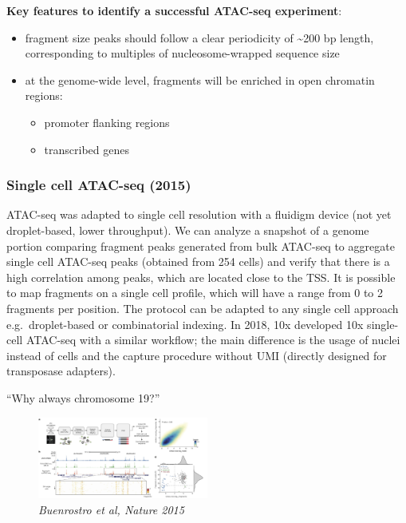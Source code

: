 \textbf{Key features to identify a successful ATAC-seq experiment}:

\begin{itemize}
\tightlist
\item
  fragment size peaks should follow a clear periodicity of
  \textasciitilde200 bp length, corresponding to multiples of
  nucleosome-wrapped sequence size
\item
  at the genome-wide level, fragments will be enriched in open chromatin
  regions:

  \begin{itemize}
  \tightlist
  \item
    promoter flanking regions
  \item
    transcribed genes
  \end{itemize}
\end{itemize}

\hypertarget{single-cell-atac-seq-2015}{%
\subsubsection{Single cell ATAC-seq
(2015)}\label{single-cell-atac-seq-2015}}

ATAC-seq was adapted to single cell resolution with a fluidigm device
(not yet droplet-based, lower throughput). We can analyze a snapshot of
a genome portion comparing fragment peaks generated from bulk ATAC-seq
to aggregate single cell ATAC-seq peaks (obtained from 254 cells) and
verify that there is a high correlation among peaks, which are located
close to the TSS. It is possible to map fragments on a single cell
profile, which will have a range from 0 to 2 fragments per position. The
protocol can be adapted to any single cell approach e.g.~droplet-based
or combinatorial indexing. In 2018, 10x developed 10x single-cell
ATAC-seq with a similar workflow; the main difference is the usage of
nuclei instead of cells and the capture procedure without UMI (directly
designed for transposase adapters).

``Why always chromosome 19?''

\begin{figure}
\centering
\includegraphics[width=0.5\textwidth]{images/Screenshot_8.png}
\caption{\emph{Buenrostro et al, Nature 2015}}
\end{figure}


